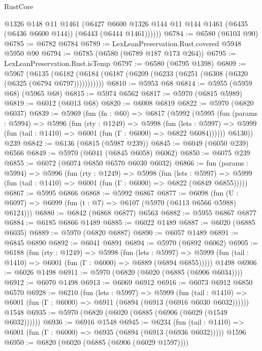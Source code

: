 \begin{lexlean}{RustCore}
\begin{coremodule}
          @1326
          @148
          @11
          @1461
          (@6427
            @6600
            @1326
            @144
            @11
            @144
            @1461
            (@6435 (@6436 @6600 @144))
            (@6443 (@6444 @1461))))))
@6784 := @6580 (@6103 @90)
@6785 := @6782 @6784
@6789 := LexLeanPreservation.Rust.covered @5948 @5950 @90
@6794 := @6785 (@6580 (@6789 @187 @173 @264))
@6795 := LexLeanPreservation.Rust.isTemp
@6797 := @6580 (@6795 @1398)
@6809 := @5967
    (@6135 (@6182 (@6184 (@6187 (@6209 (@6233 (@6251 (@6308 (@6320 (@6325 (@6794 @6797)))))))))))
@6810 := @5953 @68
@6814 := @5955 (@5959 @68) (@5965 @68)
@6815 := @5974 @6562
@6817 := @5970 (@6815 @5989)
@6819 := @6012 (@6013 @68)
@6820 := @6008 @6819
@6822 := @5970 (@6820 @6037)
@6839 := @5969
    (fun (fn : @60) =>
    @6817
      (@5992
        (@5995
          (fun (params : @5994) =>
          @5996
            (fun (rty : @1249) =>
            @5998
              (fun (lets : @5997) =>
              @5999 (fun (tail : @1410) => @6001 (fun (Γ : @6000) => @6822 @6084))))))
        @6130))
    @239
@6842 := @6136 (@6815 (@5987 @239))
@6845 := @6049 (@6050 @239) @6566
@6849 := @5970 (@6041 (@6845 @6058) @6062)
@6850 := @6075 @239
@6855 := @6072 (@6074 @6850 @6570 @6030 @6032)
@6866 := fun (params : @5994) =>
  @5996
    (fun (rty : @1249) =>
    @5998
      (fun (lets : @5997) =>
      @5999 (fun (tail : @1410) => @6001 (fun (Γ : @6000) => @6822 (@6849 @6855)))))
@6867 := @5995 @6866
@6868 := @5992 @6867
@6877 := @6098 (fun (U : @6097) => @6099 (fun (t : @7) => @6107 (@5970 (@6113 @6566 @5988) @6124)))
@6880 := @6842 (@6868 @6877) @6563
@6882 := @5955 @6867 @6877
@6884 := @6185 @6866 @1489
@6885 := @6022 @1489
@6887 := @6020 (@6885 @6035)
@6889 := @5970 (@6820 @6887)
@6890 := @6057 @1489
@6891 := @6845 @6890
@6892 := @6041 @6891
@6894 := @5970 (@6892 @6062)
@6905 := @6188
    (fun (rty : @1249) =>
    @5998
      (fun (lets : @5997) =>
      @5999 (fun (tail : @1410) => @6001 (fun (Γ : @6000) => @6889 (@6894 @6855)))))
    @1498
@6906 := @6026 @1498
@6911 := @5970 (@6820 (@6020 (@6885 (@6906 @6034))))
@6912 := @6070 @1498
@6913 := @6069 @6912
@6916 := @6073 @6912 @6850 @6570
@6928 := @6210
    (fun (lets : @5997) =>
    @5999
      (fun (tail : @1410) => @6001 (fun (Γ : @6000) => @6911 (@6894 (@6913 (@6916 @6030 @6032))))))
    @1548
@6935 := @5970 (@6820 (@6020 (@6885 (@6906 (@6029 (@1549 @6032))))))
@6936 := @6916 @1548
@6945 := @6234
    (fun (tail : @1410) => @6001 (fun (Γ : @6000) => @6935 (@6894 (@6913 (@6936 @6032)))))
    @1596
@6950 := @6820 (@6020 (@6885 (@6906 (@6029 @1597))))

\end{coremodule}
\end{lexlean}
